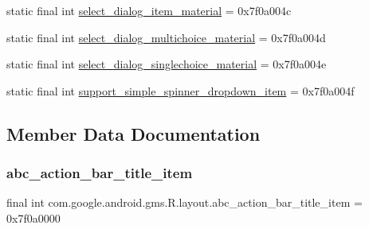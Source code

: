 \begin{DoxyCompactItemize}
\item 
static final int \mbox{\hyperlink{classcom_1_1google_1_1android_1_1gms_1_1R_1_1layout_a6940ad84caaa6b7abd48bab86262a497}{select\+\_\+dialog\+\_\+item\+\_\+material}} = 0x7f0a004c
\item 
static final int \mbox{\hyperlink{classcom_1_1google_1_1android_1_1gms_1_1R_1_1layout_aeffb0c04f168bf3157cf006eeb4050c6}{select\+\_\+dialog\+\_\+multichoice\+\_\+material}} = 0x7f0a004d
\item 
static final int \mbox{\hyperlink{classcom_1_1google_1_1android_1_1gms_1_1R_1_1layout_a9dccef7f599de61ba501dc9662d0ab42}{select\+\_\+dialog\+\_\+singlechoice\+\_\+material}} = 0x7f0a004e
\item 
static final int \mbox{\hyperlink{classcom_1_1google_1_1android_1_1gms_1_1R_1_1layout_ae7660c962cd07da9500c9a859201d1ee}{support\+\_\+simple\+\_\+spinner\+\_\+dropdown\+\_\+item}} = 0x7f0a004f
\end{DoxyCompactItemize}


\subsection{Member Data Documentation}
\mbox{\label{classcom_1_1google_1_1android_1_1gms_1_1R_1_1layout_a21e5e8fa9a642e7fe4b194125333bd70}} 
\subsubsection{\texorpdfstring{abc\+\_\+action\+\_\+bar\+\_\+title\+\_\+item}{abc\_action\_bar\_title\_item}}
{\footnotesize\ttfamily final int com.\+google.\+android.\+gms.\+R.\+layout.\+abc\+\_\+action\+\_\+bar\+\_\+title\+\_\+item = 0x7f0a0000\hspace{0.3cm}{\ttfamily [static]}}

\mbox{\label{classcom_1_1google_1_1android_1_1gms_1_1R_1_1layout_ab79973fab53aad3385fd335b9e290413}} 
